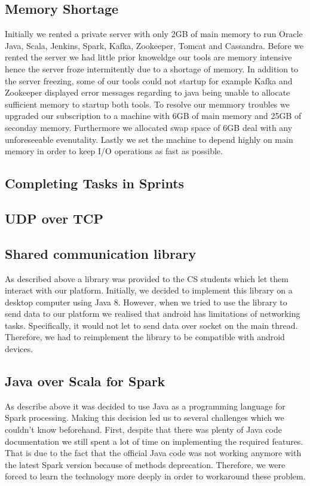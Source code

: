 \documentclass[prodmode,acmtosem]{acmsmall} %
\begin{document}
\subsection{Memory Shortage}
Initially we rented a private server with only 2GB of main memory to run Oracle Java, Scala, Jenkins, Spark, Kafka, Zookeeper, Tomcat and Cassandra. Before we rented the server we had little prior knoweldge our tools are memory intensive hence the server froze intermitently due to a shortage of memory. In addition to the server freezing, some of our tools could not startup for example Kafka and Zookeeper displayed error messages regarding to java being unable to allocate sufficient memory to startup both tools. To resolve our memmory troubles we upgraded our subscription to a machine with 6GB of main memory and 25GB of seconday memory. Furthermore we allocated swap space of 6GB deal with any unforeseeable evenutality. Lastly we set the machine to depend highly on main memory in order to keep I/O operations as fast as possible.

\subsection{Completing Tasks in Sprints}

\subsection{UDP over TCP}

\subsection{Shared communication library}
As described above a library was provided to the CS students which let them interact with our platform. Initially, we decided to implement this library on a desktop computer using Java 8. However, when we tried to use the library to send data to our platform we realised that android has limitations of networking tasks. Specifically, it would not let to send data over socket on the main thread. Therefore, we had to reimplement the library to be compatible with android devices.

\subsection{Java over Scala for Spark}
As describe above it was decided to use Java as a programming language for Spark processing. Making this decision led us to several challenges which we couldn't know beforehand. First, despite that there was plenty of Java code documentation we still spent a lot of time on implementing the required features. That is due to the fact that the official Java code was not working anymore with the latest Spark version because of methods deprecation. Therefore, we were forced to learn the technology more deeply in order to workaround these problem. 
\end{document}
